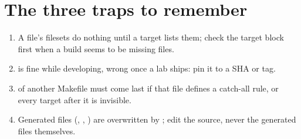 \section{The three traps to remember}

\begin{enumerate}
  \item A  file's filesets do nothing until a target lists
        them; check the target block first when a build seems to be
        missing files.
  \item {} is fine while developing, wrong once a
        lab ships: pin it to a SHA or tag.
  \item {} of another Makefile must come last if that file
        defines a catch-all rule, or every target after it is invisible.
  \item Generated files (, ,
        ) are overwritten by ; edit the
         source, never the generated files themselves.
\end{enumerate}
